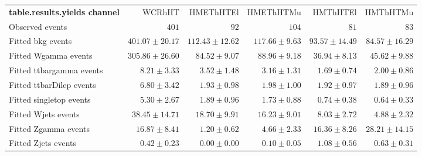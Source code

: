 

\begin{table}
\begin{center}
\setlength{\tabcolsep}{0.0pc}
{\small
\begin{tabular*}{\textwidth}{@{\extracolsep{\fill}}lrrrrr}
\noalign{\smallskip}\hline\noalign{\smallskip}
{\bf table.results.yields channel}           & WCRhHT            & HMEThHTEl            & HMEThHTMu            & HMThHTEl            & HMThHTMu              \\[-0.05cm]
\noalign{\smallskip}\hline\noalign{\smallskip}
Observed events          & $401$              & $92$              & $104$              & $81$              & $83$                    \\
\noalign{\smallskip}\hline\noalign{\smallskip}
Fitted bkg events         & $401.07 \pm 20.17$          & $112.43 \pm 12.62$          & $117.66 \pm 9.63$          & $93.57 \pm 14.49$          & $84.57 \pm 16.29$              \\
\noalign{\smallskip}\hline\noalign{\smallskip}
        Fitted Wgamma events         & $305.86 \pm 26.60$          & $84.52 \pm 9.07$          & $88.96 \pm 9.18$          & $36.94 \pm 8.13$          & $45.62 \pm 9.88$              \\
        Fitted ttbargamma events         & $8.21 \pm 3.33$          & $3.52 \pm 1.48$          & $3.16 \pm 1.31$          & $1.69 \pm 0.74$          & $2.00 \pm 0.86$              \\
        Fitted ttbarDilep events         & $6.80 \pm 3.42$          & $1.93 \pm 0.98$          & $1.98 \pm 1.00$          & $1.92 \pm 0.97$          & $1.89 \pm 0.96$              \\
        Fitted singletop events         & $5.30 \pm 2.67$          & $1.89 \pm 0.96$          & $1.73 \pm 0.88$          & $0.74 \pm 0.38$          & $0.64 \pm 0.33$              \\
        Fitted Wjets events         & $38.45 \pm 14.71$          & $18.70 \pm 9.91$          & $16.23 \pm 9.01$          & $8.03 \pm 2.72$          & $4.88 \pm 2.32$              \\
        Fitted Zgamma events         & $16.87 \pm 8.41$          & $1.20 \pm 0.62$          & $4.66 \pm 2.33$          & $16.36 \pm 8.26$          & $28.21 \pm 14.15$              \\
        Fitted Zjets events         & $0.42 \pm 0.23$          & $0.00 \pm 0.00$          & $0.10 \pm 0.05$          & $1.08 \pm 0.56$          & $0.63 \pm 0.31$              \\

\end{tabular*}}
\end{center}
\end{table}
